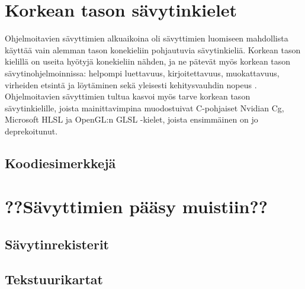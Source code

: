 \documentclass[finnish]{tktltiki2}
\theoremstyle{definition}
\theoremstyle{remark}
\begin{document}
\section{Korkean tason sävytinkielet}

Ohjelmoitavien sävyttimien alkuaikoina oli sävyttimien luomiseen mahdollista käyttää vain alemman tason konekieliin pohjautuvia sävytinkieliä. Korkean tason kielillä on useita hyötyjä konekieliin nähden, ja ne pätevät myös korkean tason sävytinohjelmoinnissa: helpompi luettavuus, kirjoitettavuus, muokattavuus, virheiden etsintä ja löytäminen sekä yleisesti kehitysvauhdin nopeus \cite{She08}. Ohjelmoitavien sävyttimien tultua kasvoi myös tarve korkean tason sävytinkielille, joista mainittavimpina muodostuivat C-pohjaiset Nvidian Cg, Microsoft HLSL ja OpenGL:n GLSL -kielet, joista ensimmäinen on jo deprekoitunut.

\subsection{Koodiesimerkkejä}

\section{??Sävyttimien pääsy muistiin??}
\subsection{Sävytinrekisterit}
\subsection{Tekstuurikartat}


%
%
% 
%







% 
\end{document}
